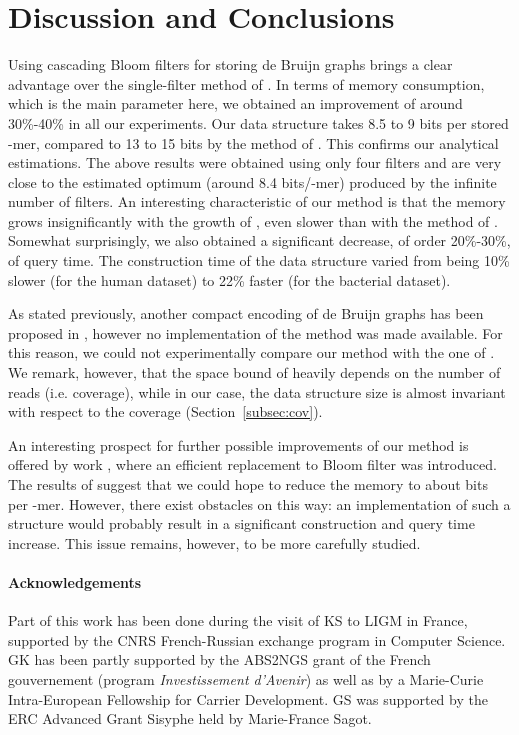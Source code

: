 \documentclass[pdftex]{llncs}\usepackage[T1]{fontenc}
\begin{document}
\section{Discussion and Conclusions}
Using cascading Bloom filters for storing de Bruijn graphs brings a
clear advantage over the single-filter method of
\cite{DBLP:conf/wabi/ChikhiR12}. In terms of memory consumption, which
is the main parameter here, we obtained an improvement of around
30\%-40\% in all our experiments. Our data structure takes 8.5 to 9 bits
per stored -mer, compared to 13 to 15 bits by the method of
\cite{DBLP:conf/wabi/ChikhiR12}. 
This confirms our analytical estimations. The above results were obtained using only
four filters and are very close to the estimated optimum (around 8.4
bits/-mer) produced by the infinite number of filters. An
interesting characteristic of our method is that the memory grows insignificantly
with the growth of , even slower than with the method of \cite{DBLP:conf/wabi/ChikhiR12}. 
Somewhat surprisingly, we also obtained a significant
decrease, of order 20\%-30\%, of query time. The construction time of
the data structure varied from being 10\% slower (for the human
dataset) to 22\% faster (for the bacterial dataset). 

As stated previously, another compact encoding of de Bruijn graphs has
been proposed in \cite{DBLP:conf/wabi/BoweOSS12}, however no
implementation of the method was made available. For this reason, we
could not experimentally compare our method with the one of
\cite{DBLP:conf/wabi/BoweOSS12}. We remark, however, that the space
bound of \cite{DBLP:conf/wabi/BoweOSS12} heavily depends on the number
of reads (i.e. coverage), while in our case, the data structure size
is almost invariant with respect to the coverage
(Section~\ref{subsec:cov}).

An interesting prospect for further possible improvements of our
method is offered by work \cite{DBLP:conf/csr/Porat09}, where an
efficient replacement to Bloom filter was introduced. The results of
\cite{DBLP:conf/csr/Porat09} suggest that we could hope to reduce the
memory to about  bits per -mer. However, 
there exist obstacles on this way: an implementation of such a
structure would probably result in a significant construction and query
time increase. This issue remains, however, to be more carefully studied. 


\paragraph{Acknowledgements} Part of this work has been done during
the visit of KS to LIGM in France, supported by the CNRS
French-Russian exchange program in Computer Science. GK has been
partly supported by the ABS2NGS grant of the French gouvernement
(program {\em Investissement d'Avenir}) as well as by a Marie-Curie
Intra-European Fellowship for Carrier Development. GS was supported by
the ERC Advanced Grant Sisyphe held by Marie-France Sagot.
\end{document}

